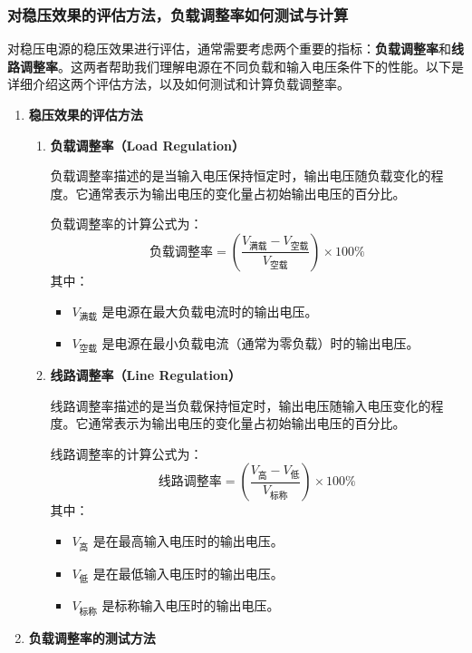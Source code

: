 \documentclass[dvipsnames, svgnames,a4paper,11pt]{article}
\begin{document}
		\subsubsection*{对稳压效果的评估方法，负载调整率如何测试与计算}

		\noindent 对稳压电源的稳压效果进行评估，通常需要考虑两个重要的指标：\textbf{负载调整率}和\textbf{线路调整率}。这两者帮助我们理解电源在不同负载和输入电压条件下的性能。以下是详细介绍这两个评估方法，以及如何测试和计算负载调整率。

		\begin{enumerate}
			\item \textbf{稳压效果的评估方法}
			\begin{enumerate}
				\item \textbf{负载调整率（Load Regulation）}
		
				负载调整率描述的是当输入电压保持恒定时，输出电压随负载变化的程度。它通常表示为输出电压的变化量占初始输出电压的百分比。
		
				负载调整率的计算公式为：
				\[
				\text{负载调整率} = \left( \frac{V_{\text{满载}} - V_{\text{空载}}}{V_{\text{空载}}} \right) \times 100\%
				\]
				其中：
				\begin{itemize}
					\item \(V_{\text{满载}}\) 是电源在最大负载电流时的输出电压。
					\item \(V_{\text{空载}}\) 是电源在最小负载电流（通常为零负载）时的输出电压。
				\end{itemize}
		
				\item \textbf{线路调整率（Line Regulation）}
		
				线路调整率描述的是当负载保持恒定时，输出电压随输入电压变化的程度。它通常表示为输出电压的变化量占初始输出电压的百分比。
		
				线路调整率的计算公式为：
				\[
				\text{线路调整率} = \left( \frac{V_{\text{高}} - V_{\text{低}}}{V_{\text{标称}}} \right) \times 100\%
				\]
				其中：
				\begin{itemize}
					\item \(V_{\text{高}}\) 是在最高输入电压时的输出电压。
					\item \(V_{\text{低}}\) 是在最低输入电压时的输出电压。
					\item \(V_{\text{标称}}\) 是标称输入电压时的输出电压。
				\end{itemize}
			\end{enumerate}
		
			\item \textbf{负载调整率的测试方法}
		

\end{enumerate}
\end{document}

